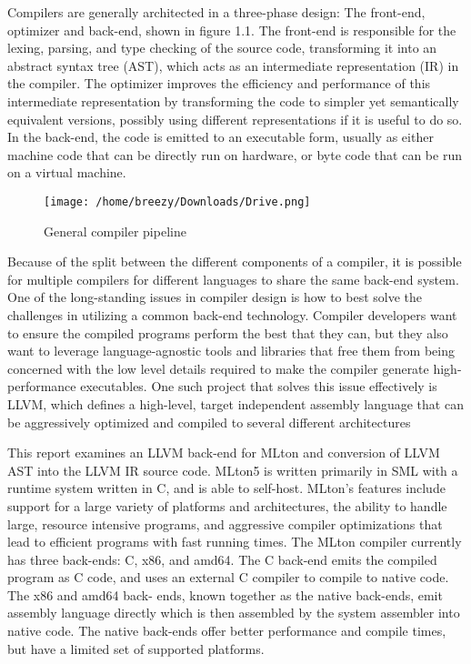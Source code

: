 \documentclass{book}
\begin{document}
Compilers are generally architected in a three-phase design: The front-end, optimizer
and back-end, shown in figure 1.1. The front-end is responsible for the lexing, parsing, and
type checking of the source code, transforming it into an abstract syntax tree (AST), which
acts as an intermediate representation (IR) in the compiler. The optimizer improves the
efficiency and performance of this intermediate representation by transforming the code to
simpler yet semantically equivalent versions, possibly using different representations if it
is useful to do so. In the back-end, the code is emitted to an executable form, usually as
either machine code that can be directly run on hardware, or byte code that can be run on a
virtual machine.\linebreak \linebreak 
\begin{figure}
	\texttt{[image: /home/breezy/Downloads/Drive.png]}
	\caption{General compiler pipeline}
	\label{fig:boat1}
\end{figure} Because of the split between the different components of a compiler, it is possible for
multiple compilers for different languages to share the same back-end system. One of the
long-standing issues in compiler design is how to best solve the challenges in utilizing a
common back-end technology. Compiler developers want to ensure the compiled programs
perform the best that they can, but they also want to leverage language-agnostic tools and
libraries that free them from being concerned with the low level details required to make the compiler generate high-performance executables.  One such project that solves this issue
effectively is LLVM, which defines a high-level, target independent assembly language
that can be aggressively optimized and compiled to several different architectures 

 This  report  examines  an  LLVM  back-end  for  MLton and conversion of LLVM AST into the LLVM IR source code. MLton5
is written primarily in SML with a runtime system written in C, and is able to self-host.
MLton's  features  include  support  for  a  large  variety  of  platforms  and  architectures,  the
ability to handle large, resource intensive programs, and aggressive compiler optimizations
that lead to efficient programs with fast running times. The MLton compiler currently has
three back-ends:  C, x86, and amd64.  The C back-end emits the compiled program as C
code, and uses an external C compiler to compile to native code. The x86 and amd64 back-
ends, known together as the native back-ends, emit assembly language directly which is
then assembled by the system assembler into native code. The native back-ends offer better
performance and compile times, but have a limited set of supported platforms.
\end{document}
